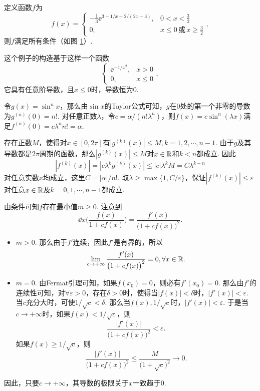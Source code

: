 \begin{ans}
  定义函数$f$为
  \[
    f(x) = \begin{cases}
      -\frac13\ee^{3-1/x+2/(2x-3)}, & 0<x<\frac32\\
      0, & x\le 0\,\text{或}\, x\ge\frac32
    \end{cases},
  \]
  则$f$满足所有条件（如图 \ref{fig1.4.24}）.
  \begin{figure}[!ht]
    \centering
  \caption{\label{fig1.4.24}}
  \end{figure}

  这个例子的构造基于这样一个函数
  \[
    \begin{cases}
      \ee^{-1/x^2}, & x>0\\
      0, & x\le0
    \end{cases},
  \]
  它具有任意阶导数，且$x\le0$时，导数恒为0.
\end{ans}

\begin{ans}
  令$g(x)=\sin^nx$，那么由$\sin x$的Taylor公式可知，$g$在$0$处的第一个非零的导数为$g^{(n)}(0)=n!$. 对任意正数$\lambda$，令$c=\alpha/(n!\lambda^n)$，则$f(x)=c\sin^n(\lambda x)$满足$f^{(n)}(0)=c\lambda^nn!=\alpha$.

  存在正数$M$，使得对$x\in[0,2\pi]$有$|g^{(k)}(x)|\le M,k=1,2,\cdots,n-1$. 由于$g$及其导数都是$2\pi$周期的函数，那么$|g^{(k)}(x)|\le M$对$x\in \mathbb R$和$k<n$都成立. 因此
  \[
    |f^{(k)}(x)|=|c\lambda^kg^{(k)}(x)|\le|c|\lambda^kM
    =C\lambda^{k-n}
  \]
  对任意实数$x$均成立，这里$C=|\alpha|/n!$. 取$\lambda\ge\max\{1,C/\varepsilon\}$，保证$|f^{(k)}(x)|\le\varepsilon$对任意$x\in\mathbb R$及$k=0,1,\cdots,n-1$都成立.
\end{ans}

\begin{ans}
  由条件可知$f$存在最小值$m\ge0$. 注意到
  \[ \dd{}x\Big( \frac{f(x)}{1+cf(x)} \Big)
    = \frac{f'(x)}{\big(1+cf(x)\big)^2}.
  \]
  \begin{itemize}
  \item  $m>0$. 那么由于$f'$连续，因此$f'$是有界的，所以
    \[ \lim_{c\to+\infty}\frac{f'(x)}{\big(1+cf(x)\big)^2}
    =0,\forall x\in\MR.
  \]
  \item $m=0$. 由Fermat引理可知，如果$f(x_0)=0$，则必有$f'(x_0)=0$. 那么由$f'$的连续性可知，对$\forall \varepsilon>0$，存在$\delta>0$时，使得当$|f(x)|<\delta$时，$|f'(x)|<\varepsilon$. 当$c$充分大时，可使$1/\sqrt c<\delta$. 那么当$f(x),1/\sqrt c$时，$|f'(x)|<\varepsilon$. 于是当$c\to+\infty$时，如果$f(x)<1/\sqrt c$，则
      \[
        \frac{|f'(x)|}{\big(1+cf(x)\big)^2}<\varepsilon.
      \]
      如果$f(x)\ge1/\sqrt c$，则
      \[
        \frac{|f'(x)|}{\big(1+cf(x)\big)^2}\le
        \frac{M}{{\big(1+\sqrt c\big)^2}}\to0.
      \]
  \end{itemize}
  因此，只要$c\to+\infty$，其导数的极限关于$x$一致趋于$0$.
\end{ans}


